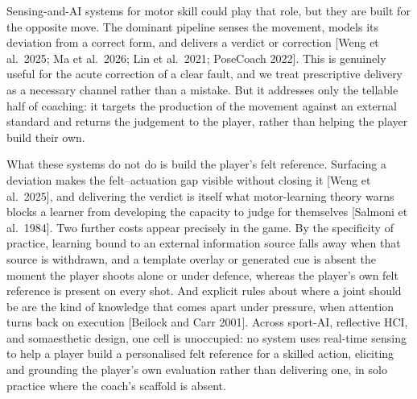 \documentclass[sigconf]{acmart}
\begin{document}
Sensing-and-AI systems for motor skill could play that role, but they are built for the opposite move. The dominant pipeline senses the movement, models its deviation from a correct form, and delivers a verdict or correction [Weng et al.\ 2025; Ma et al.\ 2026; Lin et al.\ 2021; PoseCoach 2022]. This is genuinely useful for the acute correction of a clear fault, and we treat prescriptive delivery as a necessary channel rather than a mistake. But it addresses only the tellable half of coaching: it targets the production of the movement against an external standard and returns the judgement to the player, rather than helping the player build their own.

What these systems do not do is build the player's felt reference. Surfacing a deviation makes the felt--actuation gap visible without closing it [Weng et al.\ 2025], and delivering the verdict is itself what motor-learning theory warns blocks a learner from developing the capacity to judge for themselves [Salmoni et al.\ 1984]. Two further costs appear precisely in the game. By the specificity of practice, learning bound to an external information source falls away when that source is withdrawn, and a template overlay or generated cue is absent the moment the player shoots alone or under defence, whereas the player's own felt reference is present on every shot. And explicit rules about where a joint should be are the kind of knowledge that comes apart under pressure, when attention turns back on execution [Beilock and Carr 2001]. Across sport-AI, reflective HCI, and somaesthetic design, one cell is unoccupied: no system uses real-time sensing to help a player build a personalised felt reference for a skilled action, eliciting and grounding the player's own evaluation rather than delivering one, in solo practice where the coach's scaffold is absent.
\end{document}
